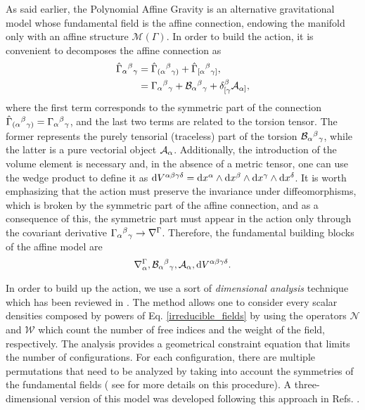 As said earlier, the Polynomial Affine Gravity is an alternative gravitational model whose fundamental field is  the affine connection, endowing the manifold only with an affine structure $\mathcal{M}(\Gamma)$. In order to build the action, it is convenient to decomposes the affine connection as
\begin{equation}
\begin{aligned}
    \label{affine_connection}
    \hat{\Gamma}_{\alpha}{}^{\beta}{}_{\gamma} & = \hat{\Gamma}_{(\alpha}{}^{\beta}{}_{\gamma)} +  \hat{\Gamma}_{[\alpha}{}^{\beta}{}_{\gamma]},  \\
    & = \Gamma_{\alpha}{}^{ \beta}{}_{\gamma} + \mathcal{B}_{\alpha}{}^{ \beta}{}_{\gamma} + \delta^{\beta}_{[\gamma}\mathcal{A}_{\alpha]},
\end{aligned}
\end{equation}
where the first term corresponds to the symmetric part of the connection $\hat{\Gamma}_{(\alpha}{}^{\beta}{}_{\gamma)} = \Gamma_{\alpha}{}^{ \beta}{}_{\gamma}$, and
the last two terms are related to the torsion tensor. The former represents  the purely tensorial (traceless) part of the torsion $\mathcal{B}_{\alpha}{}^{ \beta}{}_{\gamma}$, while the latter is a pure vectorial object $\mathcal{A}_{\alpha}$.
Additionally,  the introduction of the volume element is necessary and, in the absence of a metric tensor, one can use the wedge product to define it as  $\mathrm{d}V^{\alpha\beta\gamma\delta} = \mathrm{d}x^{\alpha}\wedge\mathrm{d}x^{\beta}\wedge
\mathrm{d}x^{\gamma}\wedge\mathrm{d}x^{\delta}$. It is worth emphasizing that the action must preserve the invariance under diffeomorphisms, which is broken by the symmetric part of the affine connection, and as a consequence of this,
the symmetric part must appear in the action only through the covariant derivative $\Gamma_{\alpha}{}^{ \beta}{}_{\gamma} \to \nabla^\Gamma$.
Therefore, the fundamental building blocks of the affine model are 
\begin{equation}
\label{irreducible_fields}
\nabla^\Gamma_\alpha, \mathcal{B}_{\alpha}{}^{ \beta}{}_{\gamma}, \mathcal{A}_\alpha, \mathrm{d}V^{\alpha\beta\gamma\delta}.
\end{equation}

In order to build up the action, we use a sort of \textit{dimensional analysis} technique which has been reviewed in \cite{castillofelisola2016einsteins,Castillo_Felisola_2020}.
The method allows one to consider every scalar densities composed by powers of Eq. \eqref{irreducible_fields} by using the operators $\mathcal{N}$ and $\mathcal{W}$ which count the number of free indices and the weight of the field, respectively. The analysis provides a geometrical constraint equation that limits the number of configurations. For each configuration, there are multiple permutations that need to be analyzed by taking into account the symmetries of the fundamental fields ( see \cite{castillofelisola2016einsteins,Castillo_Felisola_2020}  for more details on this procedure). 
A three-dimensional version of this model was developed following this approach in Refs. \cite{Castillo_Felisola_2022_EPJC,Castillo_Felisola_2022_Universe}.

